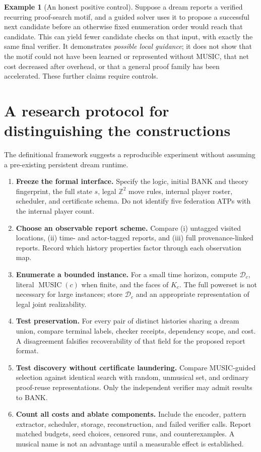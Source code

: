 \documentclass[11pt,letterpaper]{article}
\theoremstyle{definition}
\newtheorem{example}[theorem]{Example}
\theoremstyle{remark}
\newcommand{\Dream}{\mathcal{D}}
\newcommand{\Music}{\operatorname{MUSIC}}
\begin{document}
\begin{example}[An honest positive control]
Suppose a dream reports a verified recurring proof-search motif, and a guided solver uses it to propose a successful next candidate before an otherwise fixed enumeration order would reach that candidate. This can yield fewer candidate checks on that input, with exactly the same final verifier. It demonstrates \emph{possible local guidance}; it does not show that the motif could not have been learned or represented without MUSIC, that net cost decreased after overhead, or that a general proof family has been accelerated. These further claims require controls.
\end{example}

\section{A research protocol for distinguishing the constructions}
The definitional framework suggests a reproducible experiment without assuming a pre-existing persistent dream runtime.
\begin{enumerate}[label=\textbf{E\arabic*.}]
\item \textbf{Freeze the formal interface.} Specify the logic, initial BANK and theory fingerprint, the full state $s$, legal $\mathbb Z^2$ move rules, internal player roster, scheduler, and certificate schema. Do not identify five federation ATPs with the internal player count.
\item \textbf{Choose an observable report scheme.} Compare (i) untagged visited locations, (ii) time- and actor-tagged reports, and (iii) full provenance-linked reports. Record which history properties factor through each observation map.
\item \textbf{Enumerate a bounded instance.} For a small time horizon, compute $\Dream_c$, literal $\Music(c)$ when finite, and the faces of $K_c$. The full powerset is not necessary for large instances; store $\Dream_c$ and an appropriate representation of legal joint realizability.
\item \textbf{Test preservation.} For every pair of distinct histories sharing a dream union, compare terminal labels, checker receipts, dependency scope, and cost. A disagreement falsifies recoverability of that field for the proposed report format.
\item \textbf{Test discovery without certificate laundering.} Compare MUSIC-guided selection against identical search with random, unmusical set, and ordinary proof-reuse representations. Only the independent verifier may admit results to BANK.
\item \textbf{Count all costs and ablate components.} Include the encoder, pattern extractor, scheduler, storage, reconstruction, and failed verifier calls. Report matched budgets, seed choices, censored runs, and counterexamples. A musical name is not an advantage until a measurable effect is established.
\end{enumerate}
\end{document}
